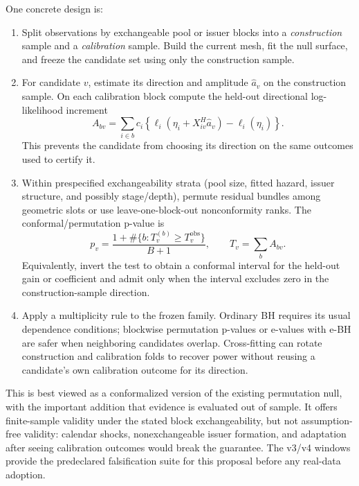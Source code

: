 \documentclass[11pt]{article}
\begin{document}
One concrete design is:
\begin{enumerate}[leftmargin=2em,itemsep=2pt]
\item Split observations by exchangeable pool or issuer blocks into a \emph{construction} sample and
a \emph{calibration} sample. Build the current mesh, fit the null surface, and freeze the candidate
set using only the construction sample.
\item For candidate $v$, estimate its direction and amplitude $\hat a_v$ on the construction sample.
On each calibration block compute the held-out directional log-likelihood increment
\[
A_{bv}=\sum_{i\in b}c_i\left\{\ell_i(\eta_i+X^H_{iv}\hat a_v)-\ell_i(\eta_i)\right\}.
\]
This prevents the candidate from choosing its direction on the same outcomes used to certify it.
\item Within prespecified exchangeability strata (pool size, fitted hazard, issuer structure, and
possibly stage/depth), permute residual bundles among geometric slots or use leave-one-block-out
nonconformity ranks. The conformal/permutation p-value is
\[
p_v=\frac{1+\#\{b:T^{(b)}_v\ge T^{\mathrm{obs}}_v\}}{B+1},
\qquad T_v=\sum_b A_{bv}.
\]
Equivalently, invert the test to obtain a conformal interval for the held-out gain or coefficient and
admit only when the interval excludes zero in the construction-sample direction.
\item Apply a multiplicity rule to the frozen family. Ordinary BH requires its usual dependence
conditions; blockwise permutation p-values or e-values with e-BH are safer when neighboring
candidates overlap. Cross-fitting can rotate construction and calibration folds to recover power
without reusing a candidate's own calibration outcome for its direction.
\end{enumerate}

This is best viewed as a conformalized version of the existing permutation null, with the important
addition that evidence is evaluated out of sample. It offers finite-sample validity under the stated
block exchangeability, but not assumption-free validity: calendar shocks, nonexchangeable issuer
formation, and adaptation after seeing calibration outcomes would break the guarantee. The v3/v4
windows provide the predeclared falsification suite for this proposal before any real-data adoption.
\end{document}
